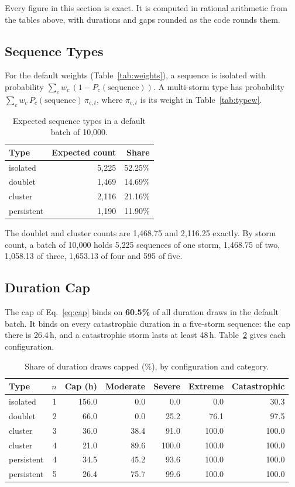 \documentclass[11pt,a4paper]{article}
\begin{document}
\mkmsensitivity

Every figure in this section is exact. It is computed in rational arithmetic from the
tables above, with durations and gaps rounded as the code rounds them.

\subsection{Sequence Types}
For the default weights (Table~\ref{tab:weights}), a sequence is isolated with
probability $\sum_c w_c\,(1 - P_c(\text{sequence}))$. A multi-storm type has probability
$\sum_c w_c\,P_c(\text{sequence})\,\pi_{c,t}$, where $\pi_{c,t}$ is its weight in
Table~\ref{tab:typew}.
\begin{table}[H]
\centering\small
\caption{Expected sequence types in a default batch of 10{,}000.}\label{tab:t9}
\begin{tabular}{lrr}
\toprule
Type & Expected count & Share \\
\midrule
isolated & 5{,}225 & 52.25\% \\
doublet & 1{,}469 & 14.69\% \\
cluster & 2{,}116 & 21.16\% \\
persistent & 1{,}190 & 11.90\% \\
\bottomrule
\end{tabular}
\end{table}
The doublet and cluster counts are 1{,}468.75 and 2{,}116.25 exactly. By storm count, a batch
of 10{,}000 holds 5{,}225 sequences of one storm, 1{,}468.75 of two, 1{,}058.13 of three,
1{,}653.13 of four and 595 of five.

\subsection{Duration Cap}
The cap of Eq.~\eqref{eq:cap} binds on \textbf{60.5\%} of all duration draws in the default
batch. It binds on every catastrophic duration in a five-storm sequence: the cap there is
26.4\,h, and a catastrophic storm lasts at least 48\,h. Table~\ref{tab:cap} gives each
configuration.
\begin{table}[H]
\centering\small
\caption{Share of duration draws capped (\%), by configuration and category.}\label{tab:cap}
\begin{tabular}{lrrrrrr}
\toprule
Type & $n$ & Cap (h) & Moderate & Severe & Extreme & Catastrophic \\
\midrule
isolated & 1 & 156.0 & 0.0 & 0.0 & 0.0 & 30.3 \\
doublet & 2 & 66.0 & 0.0 & 25.2 & 76.1 & 97.5 \\
cluster & 3 & 36.0 & 38.4 & 91.0 & 100.0 & 100.0 \\
cluster & 4 & 21.0 & 89.6 & 100.0 & 100.0 & 100.0 \\
persistent & 4 & 34.5 & 45.2 & 93.6 & 100.0 & 100.0 \\
persistent & 5 & 26.4 & 75.7 & 99.6 & 100.0 & 100.0 \\
\bottomrule
\end{tabular}
\end{table}
\end{document}
